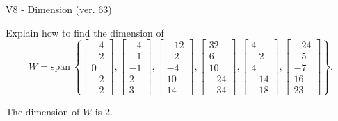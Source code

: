 \begin{exercise}
  \begin{exerciseTitle}V8 - Dimension (ver. 63)\end{exerciseTitle}
  \begin{exerciseStatement}
    Explain how to find the dimension of 
\[W=\mathrm{span}\ \left\{\left[\begin{array}{r}
-4 \\
-2 \\
0 \\
-2 \\
-2
\end{array}\right] , \left[\begin{array}{r}
-4 \\
-1 \\
-1 \\
2 \\
3
\end{array}\right] , \left[\begin{array}{r}
-12 \\
-2 \\
-4 \\
10 \\
14
\end{array}\right] , \left[\begin{array}{r}
32 \\
6 \\
10 \\
-24 \\
-34
\end{array}\right] , \left[\begin{array}{r}
4 \\
-2 \\
4 \\
-14 \\
-18
\end{array}\right] , \left[\begin{array}{r}
-24 \\
-5 \\
-7 \\
16 \\
23
\end{array}\right]\right\}.\]



  \end{exerciseStatement}
  \begin{exerciseAnswer}
   The dimension of \(W\) is  \(2\).
  


  \end{exerciseAnswer}
\end{exercise}